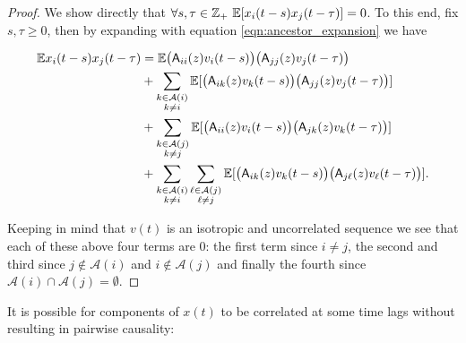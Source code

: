 \documentclass[12pt]{article}
\def\A{\mathsf{A}}  %
\newcommand{\anc}[1]{\mathcal{A}(#1)}  %
\begin{document}
\begin{proof}
  We show directly that
  $\forall s, \tau \in \mathbb{Z}_+\ \mathbb{E}[x_i(t - s)x_j(t - \tau)] = 0$.  To this end,
  fix $s, \tau \ge 0$, then by expanding with equation \eqref{eqn:ancestor_expansion} we have

  \begin{align*}
    \E x_i(t - s)x_j(t - \tau)
    &= \E \big(\A_{ii}(z)v_i(t - s)\big)\big(\A_{jj}(z)v_j(t - \tau)\big)\\
    &+ \sum_{\substack{k \in \anc{i} \\ k \ne i}}\E[\big(\A_{ik}(z)v_k(t - s)\big)\big(\A_{jj}(z)v_j(t - \tau)\big)]\\
    &+ \sum_{\substack{k \in \anc{j} \\ k \ne j}}\E[\big(\A_{ii}(z)v_i(t - s)\big) \big(\A_{jk}(z) v_k(t - \tau)\big)]\\
    &+ \sum_{\substack{k \in \anc{i} \\ k \ne i}}\sum_{\substack{\ell \in \anc{j} \\ \ell \ne j}}\E[\big(\A_{ik}(z)v_k(t - s)\big)\big(\A_{j\ell}(z)v_\ell(t - \tau)\big)].
  \end{align*}
  
  Keeping in mind that $v(t)$ is an isotropic and uncorrelated
  sequence we see that each of these above four terms are 0: the
  first term since $i \ne j$, the second and third since
  $j \not\in \anc{i}$ and $i \not\in \anc{j}$ and finally the fourth since
  $\anc{i} \cap \anc{j} = \emptyset$.
\end{proof}

It is possible for components of $x(t)$ to be correlated at some time
lags without resulting in pairwise causality:
\end{document}

